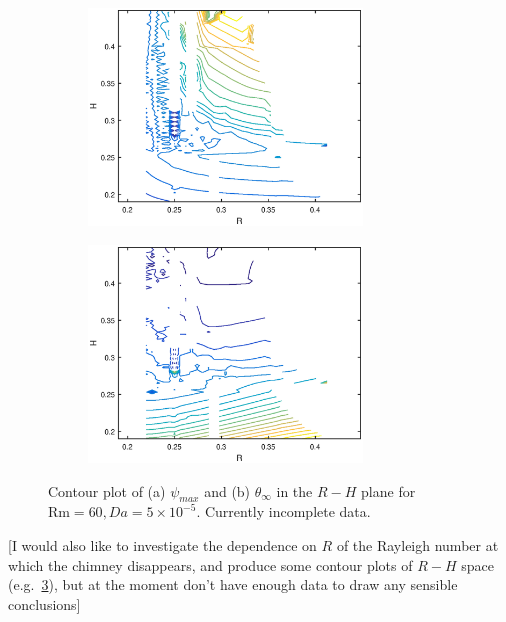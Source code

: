 \documentclass[11pt]{proc}
\begin{document}
\begin{figure}[hb!]
 \begin{subfigure}[t]{.48\linewidth}
   \centering
   \includegraphics[width=0.8\textwidth]{R-H-psi-max}
   \caption{}
   \label{fig:R-H-psi-max}   
\end{subfigure}
\quad
\begin{subfigure}[t]{.48\linewidth}
   \centering
   \includegraphics[width=0.8\textwidth]{R-H-theta-inf}
   \caption{}
   \label{fig:R-H-theta-inf}   
\end{subfigure}

\caption{Contour plot of (a) $\psi_{max}$ and (b) $\theta_\infty$ in the $R-H$ plane for $\text{Rm} = 60, Da=5\times10^{-5}$. Currently incomplete data.}
\label{fig:R-H-contour}
 
\end{figure} 
[I would also like to investigate the dependence on $R$ of the Rayleigh number at which the chimney disappears, and produce some contour plots of $R-H$ space (e.g.~\cref{fig:R-H-contour}), but at the moment don't have enough data to draw any sensible conclusions]
\end{document}
